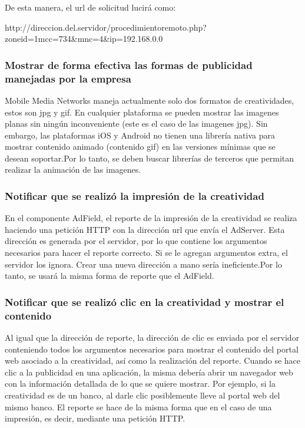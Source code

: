 De esta manera, el url de solicitud lucirá como:

\begin{center}
http://direccion.del.servidor/procedimientoremoto.php?zoneid=1mcc=734\&mnc=4\&ip=192.168.0.0
\par\end{center}


\subsubsection{Mostrar de forma efectiva las formas de publicidad manejadas por
la empresa}

Mobile Media Networks maneja actualmente solo dos formatos de creatividades,
estos son jpg y gif. En cualquier plataforma se pueden mostrar las
imagenes planas sin ningún inconveniente (este es el caso de las imagenes
jpg). Sin embargo, las plataformas iOS y Android no tienen una librería
nativa para mostrar contenido animado (contenido gif) en las versiones
mínimas que se desean soportar.Por lo tanto, se deben buscar librerías
de terceros que permitan realizar la animación de las imagenes.


\subsubsection{Notificar que se realizó la impresión de la creatividad}

En el componente AdField, el reporte de la impresión de la creatividad
se realiza haciendo una petición HTTP con la dirección url que envía
el AdServer. Esta dirección es generada por el servidor, por lo que
contiene los argumentos necesarios para hacer el reporte correcto.
Si se le agregan argumentos extra, el servidor los ignora. Crear una
nueva dirección a mano sería ineficiente.Por lo tanto, se usará la
misma forma de reporte que el AdField.


\subsubsection{Notificar que se realizó clic en la creatividad y mostrar el contenido}

Al igual que la dirección de reporte, la dirección de clic es enviada
por el servidor conteniendo todos los argumentos necesarios para mostrar
el contenido del portal web asociado a la creatividad, así como la
realización del reporte. Cuando se hace clic a la publicidad en una
aplicación, la misma debería abrir un navegador web con la información
detallada de lo que se quiere mostrar. Por ejemplo, si la creatividad
es de un banco, al darle clic posiblemente lleve al portal web del
mismo banco. El reporte se hace de la misma forma que en el caso de
una impresión, es decir, mediante una petición HTTP.

